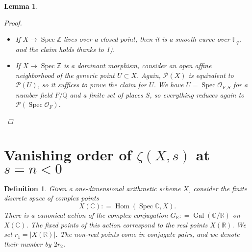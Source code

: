 \documentclass[draft]{article}
\DeclareMathOperator{\Gal}{Gal}
\DeclareMathOperator{\Hom}{Hom}
\DeclareMathOperator{\Spec}{Spec}
\newcommand{\CC}{\mathbb{C}}
\newcommand{\FF}{\mathbb{F}}
\newcommand{\QQ}{\mathbb{Q}}
\newcommand{\RR}{\mathbb{R}}
\newcommand{\ZZ}{\mathbb{Z}}
\newcommand{\dfn}{\mathrel{\mathop:}=}
\theoremstyle{myplain}
\newtheorem{lemma}[theorem]{Lemma}
\theoremstyle{mydefinition}
\newtheorem{definition}[theorem]{Definition}
\begin{document}
\begin{lemma}
\begin{proof}
    \begin{itemize}
    \item If $X \to \Spec \ZZ$ lives over a closed point, then it is a smooth
      curve over $\FF_q$, and the claim holds thanks to 1).

    \item If $X \to \Spec \ZZ$ is a dominant morphism, consider an open affine
      neighborhood of the generic point $U \subset X$. Again, $\mathcal{P} (X)$
      is equivalent to $\mathcal{P} (U)$, so it suffices to prove the claim for
      $U$. We have $U = \Spec \mathcal{O}_{F,S}$ for a number field $F/\QQ$ and
      a finite set of places $S$, so everything reduces again to
      $\mathcal{P} (\Spec \mathcal{O}_F)$. \qedhere
    \end{itemize}
  \end{proof}
\end{lemma}


\section{Vanishing order of $\zeta (X,s)$ at $s = n < 0$}
\label{sec:vanishing-order}

\begin{definition}
  Given a one-dimensional arithmetic scheme $X$, consider the finite discrete
  space of complex points
  $$X(\CC) \dfn \Hom (\Spec \CC, X).$$
  There is a canonical action of the complex conjugation
  $G_\RR \dfn \Gal (\CC/\RR)$ on $X(\CC)$. The fixed points of this action
  correspond to the real points $X (\RR)$. We set $r_1 = |X (\RR)|$. The
  non-real points come in conjugate pairs, and we denote their number by
  $2 r_2$.
\end{definition}
\end{document}
